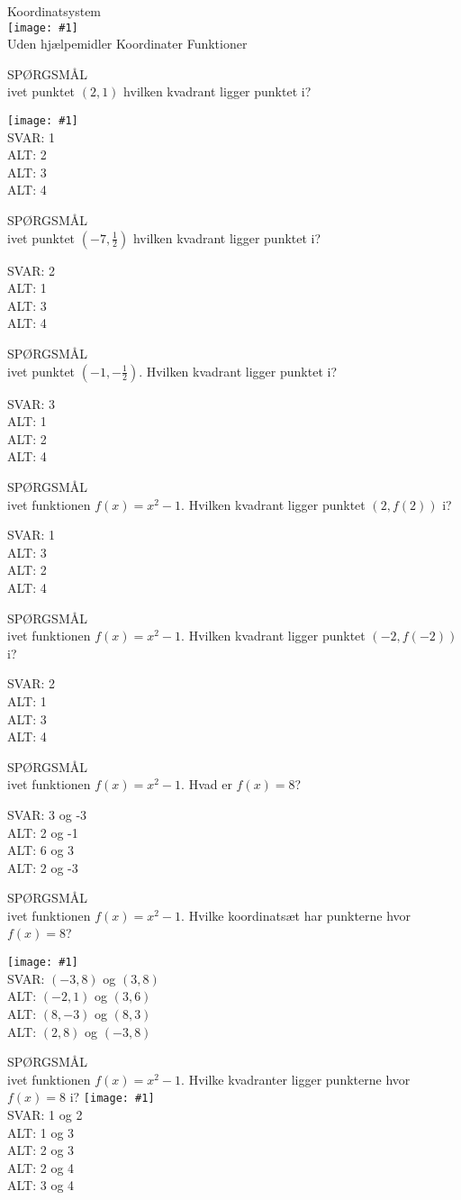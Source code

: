 \documentclass[]{article}
\newenvironment{question}[2]{SPØRGSMÅL\\}{\hspace{50px}}
\newcommand{\name}[1]{{\huge #1}\\}
\newcommand{\tag}[1]{#1}
\newcommand{\cover}[1]{\texttt{[image: \#1]}\\}
\newcommand{\image}[1]{\texttt{[image: \#1]}\\}
\newcommand{\answer}[1]{{\color{green} SVAR: #1}\\}
\newcommand{\alt}[1]{{\color{red} ALT: #1}\\}
\begin{document}
\name{Koordinatsystem}
\cover{koordinatsystem.png}
\tag{Uden hjælpemidler}
\tag{Koordinater}
\tag{Funktioner}

\begin{question}{multi}

Givet punktet $(2,1)$ hvilken kvadrant ligger punktet i?

\image{quadrant.jpg}

\answer{1}
\alt{2}
\alt{3}
\alt{4}

\end{question}

\begin{question}{multi}
Givet punktet $(-7,\frac{1}{2})$ hvilken kvadrant ligger punktet i?

\answer{2}
\alt{1}
\alt{3}
\alt{4}

\end{question}

\begin{question}{multi}
    
Givet punktet $(-1,-\frac{1}{2})$. Hvilken kvadrant ligger punktet i?
    
\answer{3}
\alt{1}
\alt{2}
\alt{4}

\end{question}

\begin{question}{multi}
    
    Givet funktionen $f(x)=x^2 - 1$. Hvilken kvadrant ligger punktet $(2, f(2))$ i?

    \answer{1}
    \alt{3}
    \alt{2}
    \alt{4}
    
\end{question}

\begin{question}{multi}
    
    Givet funktionen $f(x)=x^2 - 1$. Hvilken kvadrant ligger punktet $(-2, f(-2))$ i?

    \answer{2}
    \alt{1}
    \alt{3}
    \alt{4}
    
\end{question}

\begin{question}{multi}
    
    Givet funktionen $f(x)=x^2 - 1$. Hvad er $f(x)=8$?

    \answer{3 og -3}
    \alt{2 og -1}
    \alt{6 og 3}
    \alt{2 og -3}

\end{question}

\begin{question}{multi}
    
    Givet funktionen $f(x)=x^2 - 1$. Hvilke koordinatsæt har punkterne hvor $f(x)=8$?

    \image{andengradsfunktioner.png}

    \answer{$(-3, 8)$ og $(3, 8)$}
    \alt{$(-2, 1)$ og $(3, 6)$}
    \alt{$(8, -3)$ og $(8, 3)$}
    \alt{$(2, 8)$ og $(-3, 8)$}

\end{question}

\begin{question}{multi}
    
    Givet funktionen $f(x)=x^2 - 1$. Hvilke kvadranter ligger punkterne hvor $f(x)=8$ i?
    \image{andengradsfunktionermedpunkter.png}

    \answer{1 og 2}
    \alt{1 og 3}
    \alt{2 og 3}
    \alt{2 og 4}
    \alt{3 og 4}

\end{question}
\end{document}
